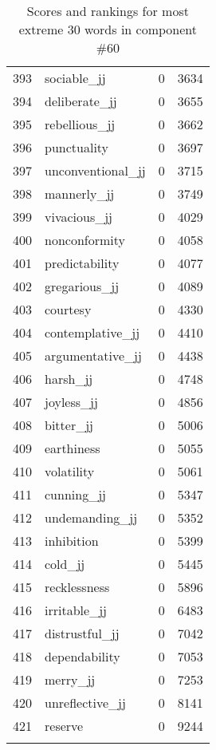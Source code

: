 \begin{longtable}[!htbp]{| rlr@{.}l |}
    393 & sociable\_jj & 0 & 3634 \\
    394 & deliberate\_jj & 0 & 3655 \\
    395 & rebellious\_jj & 0 & 3662 \\
    396 & punctuality & 0 & 3697 \\
    397 & unconventional\_jj & 0 & 3715 \\
    398 & mannerly\_jj & 0 & 3749 \\
    399 & vivacious\_jj & 0 & 4029 \\
    400 & nonconformity & 0 & 4058 \\
    401 & predictability & 0 & 4077 \\
    402 & gregarious\_jj & 0 & 4089 \\
    403 & courtesy & 0 & 4330 \\
    404 & contemplative\_jj & 0 & 4410 \\
    405 & argumentative\_jj & 0 & 4438 \\
    406 & harsh\_jj & 0 & 4748 \\
    407 & joyless\_jj & 0 & 4856 \\
    408 & bitter\_jj & 0 & 5006 \\
    409 & earthiness & 0 & 5055 \\
    410 & volatility & 0 & 5061 \\
    411 & cunning\_jj & 0 & 5347 \\
    412 & undemanding\_jj & 0 & 5352 \\
    413 & inhibition & 0 & 5399 \\
    414 & cold\_jj & 0 & 5445 \\
    415 & recklessness & 0 & 5896 \\
    416 & irritable\_jj & 0 & 6483 \\
    417 & distrustful\_jj & 0 & 7042 \\
    418 & dependability & 0 & 7053 \\
    419 & merry\_jj & 0 & 7253 \\
    420 & unreflective\_jj & 0 & 8141 \\
    421 & reserve & 0 & 9244 \\
    \hline
    \caption{Scores and rankings for most extreme 30 words in component \#60} \\
\end{longtable}
